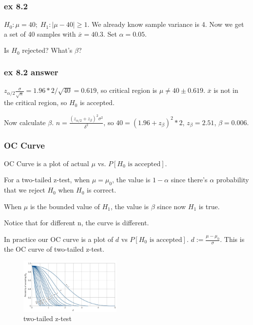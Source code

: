 \documentclass{beamer}
\begin{document}
\begin{frame}
    \frametitle{ex 8.2}
    $H_0: \mu=40;\; H_1: |\mu-40|\geq 1$. We already know sample variance is 4. Now we get a set of 40 samples with $\overline{x}=40.3$. Set $\alpha=0.05$.\par
    Is $H_0$ rejected? What's $\beta$?\par
    \vspace*{0.3cm}

\end{frame}

\begin{frame}
    \frametitle{ex 8.2 answer}

    $z_{\alpha/2}\frac{\sigma}{\sqrt{n}}=1.96*2/\sqrt{40}=0.619$, so critical region is $\mu\neq 40\pm 0.619$. $\overline{x}$ is not in the critical region, so $H_0$ is accepted.\par
    Now calculate $\beta$. $n=\frac{(z_{\alpha/2}+{z_{\beta}})^2\sigma^2}{\delta^2}$, so $40=(1.96+z_{\beta})^2*2$, $z_{\beta}=2.51$, $\beta=0.006$.

\end{frame}

\begin{frame}
    \frametitle{OC Curve}
    OC Curve is a plot of actual $\mu$ vs. $P[H_0 \text{ is accepted}]$.\par
    For a two-tailed z-test, when $\mu=\mu_0$, the value is $1-\alpha$ since there's $\alpha$ probability that we reject $H_0$ when $H_0$ is correct.\par
    When $\mu$ is the bounded value of $H_1$, the value is $\beta$ since now $H_1$ is true.\par
    Notice that for different n, the curve is different.\par
    In practice our OC curve is a plot of $d$ vs $P[H_0 \text{ is accepted}]$. $d:=\frac{\mu-\mu_0}{\sigma}$.
    This is the OC curve of two-tailed z-test.
    \begin{figure}[H]
        \centering
        \includegraphics[width=0.45\textwidth,height=0.2\textwidth]{z_oc_2tail.jpg}
        \caption{two-tailed z-test}
    \end{figure}\par

\end{frame}
\end{document}
